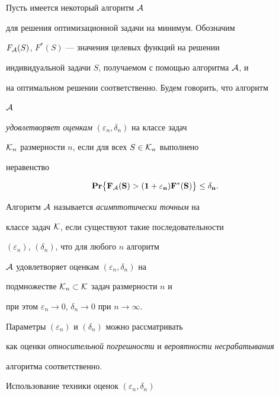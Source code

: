 \section{ \ }





Пусть имеется некоторый алгоритм ${\cal A}$


для решения оптимизационной задачи на минимум. Обозначим


$F_{\cal A}(S)$, $F^*(S)$ --- значения целевых функций на решении


индивидуальной задачи $S$, получаемом с помощью алгоритма ${\cal A}$, и


на оптимальном решении соответственно. Будем говорить, что алгоритм


${\cal A}$


{\em удовлетворяет оценкам} $(\varepsilon_n,\delta_n)$ на классе задач


${\cal K}_n$ размерности $n$, если для всех $S\in {\cal K}_n$ выполнено


неравенство


$$


\PR \bigl\{F_{\cal A}(S) > (1+\varepsilon_n)F^*(S)


\bigr \} \le \delta_n .


$$


Алгоритм ${\cal A}$ называется {\em асимптотически точным} на


классе задач ${\cal K}$, если существуют такие последовательности


$(\varepsilon_n)$, $(\delta_n)$, что для любого $n$ алгоритм


${\cal A}$ удовлетворяет оценкам $(\varepsilon_n,\delta_n)$ на


подмножестве ${\cal K}_n\subset {\cal K}$ задач размерности $n$ и


при этом $\varepsilon_n\to 0$, $\delta_n\to 0$ при $n\to \infty$.








Параметры $(\varepsilon_n)$ и $(\delta_n)$ можно рассматривать


как оценки {\em относительной погрешности} и  {\em вероятности несрабатывания}


алгоритма соответственно.





Использование техники оценок $(\varepsilon_n,\delta_n)$


